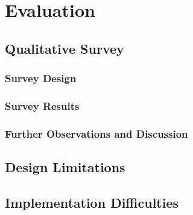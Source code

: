 \chapter{Evaluation}
\label{chp:evaluation}

\section{Qualitative Survey}

\subsection{Survey Design}
\subsection{Survey Results}
\subsection{Further Observations and Discussion}

\section{Design Limitations}

\section{Implementation Difficulties}

